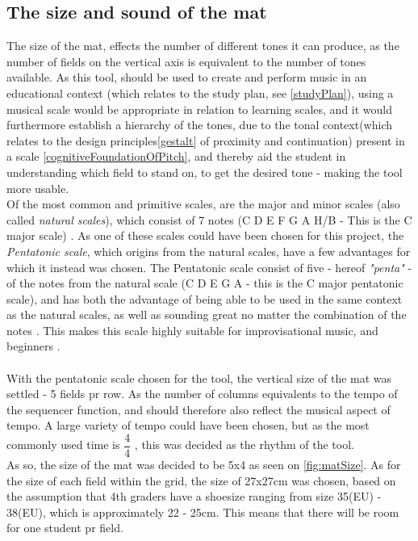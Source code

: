 \subsection{The size and sound of the mat } \label{sizeSoundColorMat}
The size of the mat, effects the number of different tones it can produce, as the number of fields on the vertical axis is equivalent to the number of tones available. As this tool, should be used to create and perform music in an educational context (which relates to the study plan, see \autoref{studyPlan}), using a musical scale would be appropriate in relation to learning scales, and it would furthermore establish a hierarchy of the tones, due to the tonal context(which relates to the design principles\autoref{gestalt} of proximity and continuation) present in a scale \autoref{cognitiveFoundationOfPitch}, and thereby aid the student in understanding which field to stand on, to get the desired tone - making the tool more usable.  \\
Of the most common and primitive scales, are the major and minor scales (also called \textit{natural scales}), which consist of 7 notes (C D E F G A H/B - This is the C major scale) \cite{scales}. As one of these scales could have been chosen for this project, the \textit{Pentatonic scale}, which origins from the natural scales, have a few advantages for which it instead was chosen. The Pentatonic scale consist of five - hereof \textit{"penta"} - of the notes from the natural scale (C D E G A - this is the C major pentatonic scale), and has both the advantage of being able to be used in the same context as the natural scales, as well as sounding great no matter the combination of the notes \cite{pentatonicScale}. This makes this scale highly suitable for improvisational music, and beginners \cite{pentatonicScale}.  \\\\ 

With the pentatonic scale chosen for the tool, the vertical size of the mat was settled - 5 fields pr row. As the number of columns equivalents to the tempo of the sequencer function, and should therefore also reflect the musical aspect of tempo. A large variety of tempo could have been chosen, but as the most commonly used time is $\dfrac{4}{4} $ \cite{tempo}, this was decided as the rhythm of the tool. \\ As so, the size of the mat was decided to be 5x4 as seen on \autoref{fig:matSize}. As for the size of each field within the grid, the size of 27x27cm was chosen, based on the assumption that 4th graders have a shoesize ranging from size 35(EU) - 38(EU), which is approximately 22 - 25cm. This means that there will be room for one student pr field.       


